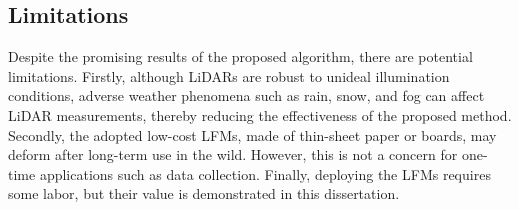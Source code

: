 \begin{table}[h]
\caption{Ablation studies on the first and second graphs.}
	\centering
	\resizebox{0.7\columnwidth}{!}{
		\begin{tabular}{c|c|c|c}
			\hline\hline
				 Scene & Framework & $\mathrm{RMSE}_{T}$ (m) $\downarrow$ & $\mathrm{RMSE}_{R}$ (rad) $\downarrow$\\ \hline
\multirow{3}{*}{Fig. \ref{glbtraj}} & without first graph & 0.431 & 0.459 \\
& without second graph & 0.078 & 0.084 \\
& with both graphs & 0.066 & 0.072 \\
\hline
\multirow{3}{*}{Fig. \ref{newbench}} & without first graph & 0.088 & 0.112 \\
& without second graph & 0.021 & 0.073 \\
(Kitchen) & with both graphs & 0.019 & 0.067 \\
\hline  \hline
			
		\end{tabular}
	}
		\label{abtab}
\end{table}

\subsection{Limitations} 
Despite the promising results of the proposed algorithm, there are potential limitations. Firstly, although LiDARs are robust to unideal illumination conditions, adverse weather phenomena such as rain, snow, and fog can affect LiDAR measurements, thereby reducing the effectiveness of the proposed method. Secondly, the adopted low-cost LFMs, made of thin-sheet paper or boards, may deform after long-term use in the wild. However, this is not a concern for one-time applications such as data collection. Finally, deploying the LFMs requires some labor, but their value is demonstrated in this dissertation.